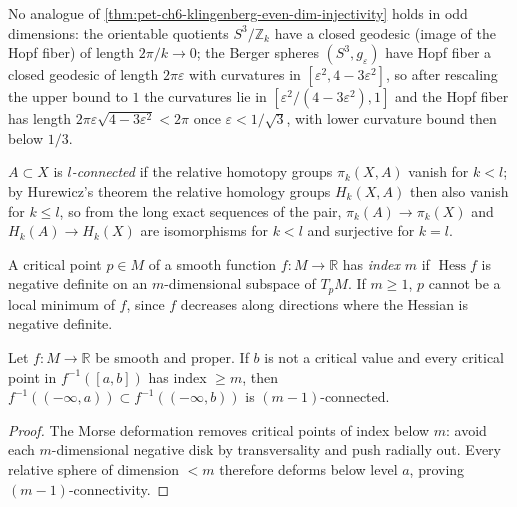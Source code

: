 \begin{remark}
  \label{rem:pet-ch6-klingenberg-odd-dim-counterexample}
  No analogue of \cref{thm:pet-ch6-klingenberg-even-dim-injectivity} holds in
  odd dimensions: the orientable quotients $S^3/\mathbb{Z}_k$ have a closed
  geodesic (image of the Hopf fiber) of length $2\pi/k\to0$; the Berger
  spheres $(S^3,g_\varepsilon)$ have Hopf fiber a closed geodesic of length
  $2\pi\varepsilon$ with curvatures in $[\varepsilon^2,4-3\varepsilon^2]$, so
  after rescaling the upper bound to $1$ the curvatures lie in
  $[\varepsilon^2/(4-3\varepsilon^2),1]$ and the Hopf fiber has length
  $2\pi\varepsilon\sqrt{4-3\varepsilon^2}<2\pi$ once $\varepsilon<1/\sqrt3$,
  with lower curvature bound then below $1/3$.
\end{remark}

\begin{definition}
  \label{def:pet-ch6-l-connected}
  $A\subset X$ is \emph{$l$-connected} if the relative homotopy groups
  $\pi_k(X,A)$ vanish for $k<l$; by Hurewicz's theorem the relative homology
  groups $H_k(X,A)$ then also vanish for $k\le l$, so from the long exact
  sequences of the pair, $\pi_k(A)\to\pi_k(X)$ and $H_k(A)\to H_k(X)$ are
  isomorphisms for $k<l$ and surjective for $k=l$.
\end{definition}

\begin{definition}
  \label{def:pet-ch6-critical-point-index}
  A critical point $p\in M$ of a smooth function $f:M\to\mathbb{R}$ has \emph{index}
  $m$ if $\operatorname{Hess}f$ is negative definite on an $m$-dimensional subspace of
  $T_pM$. If $m\ge1$, $p$ cannot be a local minimum of $f$, since $f$
  decreases along directions where the Hessian is negative definite.
\end{definition}

\begin{theorem}
  \label{thm:pet-ch6-morse-connectivity}
  Let $f:M\to\mathbb{R}$ be smooth and proper. If $b$ is not a critical value and
  every critical point in $f^{-1}([a,b])$ has index $\ge m$, then
  $f^{-1}((-\infty,a))\subset f^{-1}((-\infty,b))$ is $(m-1)$-connected.
\end{theorem}
\begin{proof}
  \sketch
  The Morse deformation removes critical points of index below \(m\): avoid each \(m\)-dimensional negative disk by transversality and push radially out. Every relative sphere of dimension \(<m\) therefore deforms below level \(a\), proving \((m-1)\)-connectivity.
\end{proof}

